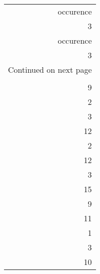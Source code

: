 \begin{longtable}{r}
\toprule
 occurence \\
         3 \\
\midrule
\endfirsthead

\toprule
 occurence \\
         3 \\
\midrule
\endhead
\midrule
\multicolumn{1}{r}{{Continued on next page}} \\
\midrule
\endfoot

\bottomrule
\endlastfoot
         1 \\
         9 \\
         2 \\
         3 \\
        12 \\
         2 \\
        12 \\
         3 \\
        15 \\
         9 \\
        11 \\
         1 \\
         3 \\
        10 \\
\end{longtable}
